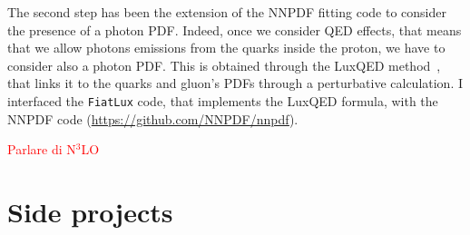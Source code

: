 \documentclass[11pt,a4paper]{moderncv}        %
\begin{document}
The second step has been the extension of the NNPDF fitting code to consider the presence of a photon PDF.
Indeed, once we consider QED effects, that means that we allow photons emissions from the quarks inside the proton, we have to consider also
a photon PDF.
This is obtained through the LuxQED method~\cite{Manohar:2016nzj, Manohar:2017eqh}, that links it to the quarks and gluon's PDFs
through a perturbative calculation.
I interfaced the \texttt{FiatLux} code, that implements the LuxQED formula, with the NNPDF code (\url{https://github.com/NNPDF/nnpdf}).


\textcolor{red}{Parlare di N$^3$LO}

\section{Side projects}


\end{document}
